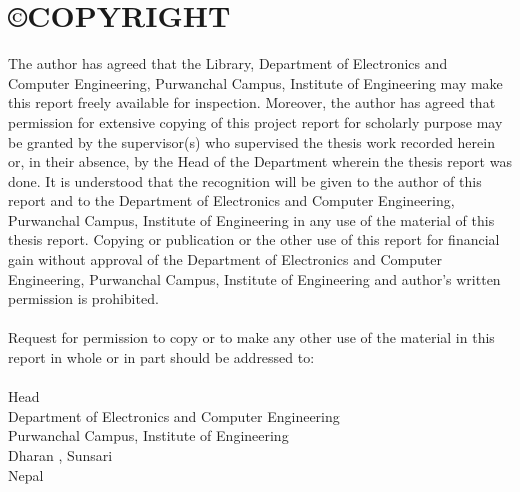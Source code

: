 \newpage
{}
\section*{\copyright COPYRIGHT}
\par
The author has agreed that the Library, Department of Electronics and Computer Engineering, Purwanchal Campus, Institute of Engineering may make this report freely
available for inspection. Moreover, the author has agreed that permission for extensive
copying of this project report for scholarly purpose may be granted by the supervisor(s)
who supervised the thesis work recorded herein or, in their absence, by the Head of
the Department wherein the thesis report was done. It is understood that the
recognition will be given to the author of this report and to the Department of
Electronics and Computer Engineering, Purwanchal Campus, Institute of Engineering in
any use of the material of this thesis report. Copying or publication or the other use of
this report for financial gain without approval of the Department of Electronics and
Computer Engineering, Purwanchal Campus, Institute of Engineering and author’s
written permission is prohibited.\\
\\
Request for permission to copy or to make any other use of the material in this report
in whole or in part should be addressed to:\\
\\
Head\\
Department of Electronics and Computer Engineering\\
Purwanchal Campus, Institute of Engineering\\
Dharan , Sunsari\\
Nepal